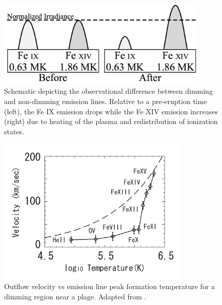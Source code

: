 \begin{figure}[!htb]
	\caption[Schematic of thermal dimming]{
	    Schematic depicting the observational difference between dimming and non-dimming emission
	    lines. Relative to a pre-eruption time (left), the Fe IX emission drops while the Fe XIV
	    emission increases (right) due to heating of the plasma and redistribution of ionization
	    states.
	}
    \begin{center}
	    \includegraphics[width=100mm]{Images/ThermalDimming.png}
    \end{center}
    \label{thermalDimming}
\end{figure}

\begin{figure}[!htb]
    \caption[Outflow velocity vs temperature]{
        Outflow velocity vs emission line peak formation temperature for a dimming region near a plage. 
        Adapted from \citet{Imada2007}.
        }
    \begin{center}
        \includegraphics[width=90mm]{Images/UpflowVsTemperature.png}
    \end{center}
    \label{upflowVsTemperature}    
\end{figure}


